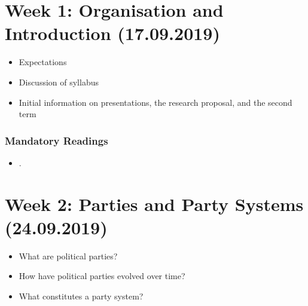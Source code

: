 \documentclass[abstract=on,parskip=full,headings=standardclasses,fontsize=11pt,paper=a4]{scrartcl}
\begin{document}
\begin{itemize}
\end{itemize}



\newpage

\tableofcontents

\section{Week 1: Organisation and Introduction (17.09.2019)}

\begin{itemize}
\renewcommand\labelitemi{--}
\item Expectations
\item Discussion of syllabus
\item Initial information on presentations, the research proposal, and the second term 
\end{itemize}


\subsubsection*{Mandatory Readings}
\begin{itemize}
\item {}.
\end{itemize}


\section{Week 2: Parties and Party Systems (24.09.2019)}

\begin{itemize}
\renewcommand\labelitemi{--}
\item  What are political parties?
\item How have political parties evolved over time?
\item What constitutes a party system?
\end{itemize}
\end{document}
